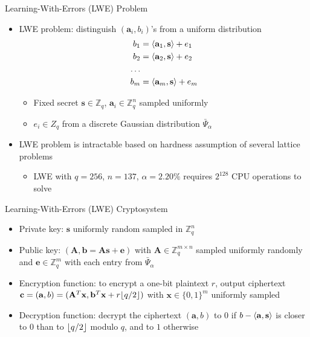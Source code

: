 \begin{frame}{Learning-With-Errors (LWE) Problem}
\begin{itemize}
    \item LWE problem: distinguish $(\mathbf{a}_i,b_i)$'s from a uniform distribution
    \begin{align*}
        b_1 &= \langle\mathbf{a}_1,\mathbf{s}\rangle + e_1\\
        b_2 &= \langle\mathbf{a}_2,\mathbf{s}\rangle + e_2\\
        \ldots\\
        b_m &= \langle\mathbf{a}_m,\mathbf{s}\rangle + e_m
    \end{align*}
    \begin{itemize}
        \item Fixed secret $\mathbf{s}\in \mathbb{Z}_q$, $\mathbf{a}_i\in \mathbb{Z}^n_q$ sampled uniformly
        \item $e_i \in Z_q$ from a discrete Gaussian distribution $\bar{\Psi}_\alpha$
    \end{itemize}
    \item LWE problem is intractable based on hardness assumption of several lattice problems
        \begin{itemize}
            \item LWE with $q=256$, $n = 137$, $\alpha = 2.20\%$ requires $2^{128}$ CPU operations to solve 
        \end{itemize}
\end{itemize}
\end{frame}

\begin{frame}{Learning-With-Errors (LWE) Cryptosystem}
\begin{itemize}
    \item Private key: $\mathbf{s}$ uniformly random sampled in $\mathbb{Z}_q^n$ 
    \item Public key:  $(\mathbf{A},\mathbf{b}=\mathbf{A}\mathbf{s}+\mathbf{e})$ with $\mathbf{A}\in \mathbb{Z}_q^{m\times n}$ sampled uniformly randomly and $\mathbf{e}\in \mathbb{Z}_q^m$ with each entry from $\bar{\Psi}_\alpha$
    \item Encryption function: to encrypt a one-bit plaintext $r$, output ciphertext $\mathbf{c}=(\mathbf{a},b) = (\mathbf{A}^T\mathbf{x},\mathbf{b}^T\mathbf{x}+ r\lfloor q/2\rfloor)$ with $\mathbf{x}\in\{0,1\}^m$ uniformly sampled
    \item Decryption function: decrypt the ciphertext $(\mathbf{a},b)$ to $0$ if $b-\langle\mathbf{a},\mathbf{s}\rangle$ is closer to $0$ than to $\lfloor q/2\rfloor$ modulo $q$, and to $1$ otherwise
\end{itemize}
\end{frame}

